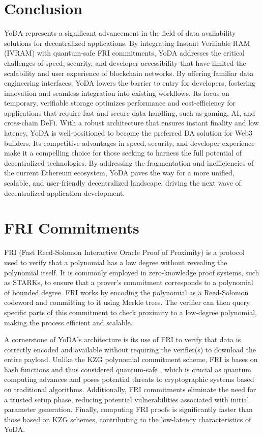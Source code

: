 \documentclass[11pt]{article}
\begin{document}
\section{Conclusion}
YoDA represents a significant advancement in the field of data availability solutions for decentralized applications. By integrating Instant Verifiable RAM (IVRAM) with quantum-safe FRI commitments, YoDA addresses the critical challenges of speed, security, and developer accessibility that have limited the scalability and user experience of blockchain networks. By offering familiar data engineering interfaces, YoDA lowers the barrier to entry for developers, fostering innovation and seamless integration into existing workflows. Its focus on temporary, verifiable storage optimizes performance and cost-efficiency for applications that require fast and secure data handling, such as gaming, AI, and cross-chain DeFi.
%
With a robust architecture that ensures instant finality and low latency, YoDA is well-positioned to become the preferred DA solution for Web3 builders. Its competitive advantages in speed, security, and developer experience make it a compelling choice for those seeking to harness the full potential of decentralized technologies. By addressing the fragmentation and inefficiencies of the current Ethereum ecosystem, YoDA paves the way for a more unified, scalable, and user-friendly decentralized landscape, driving the next wave of decentralized application development.

\clearpage 
\printbibliography

\appendix
\section{FRI Commitments}
FRI (Fast Reed-Solomon Interactive Oracle Proof of Proximity) \cite{bensasson18} is a protocol used to verify that a polynomial has a low degree without revealing the polynomial itself. It is commonly employed in zero-knowledge proof systems, such as STARKs, to ensure that a prover’s commitment corresponds to a polynomial of bounded degree. FRI works by encoding the polynomial as a Reed-Solomon codeword \cite{Geisel1990TutorialOR} and committing to it using Merkle trees. The verifier can then query specific parts of this commitment to check proximity to a low-degree polynomial, making the process efficient and scalable.

A cornerstone of YoDA's architecture is its use of FRI to verify that data is correctly encoded and available without requiring the verifier(s) to download the entire payload. Unlike the KZG polynomial commitment scheme, FRI is bases on hash functions and thus considered quantum-safe \cite{zych2018quantum}, which is crucial as quantum computing advances and poses potential threats to cryptographic systems based on traditional algorithms. Additionally, FRI commitments eliminate the need for a trusted setup phase, reducing potential vulnerabilities associated with initial parameter generation. Finally, computing FRI proofs is significantly faster than those based on KZG schemes, contributing to the low-latency characteristics of YoDA.
\end{document}
